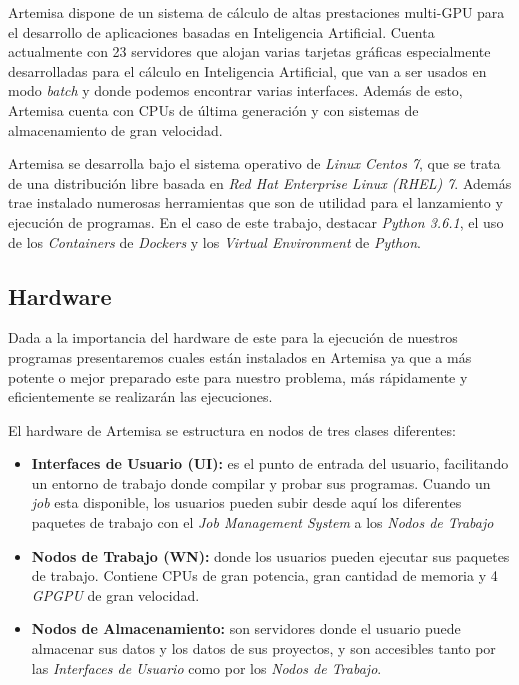 Artemisa dispone de un sistema de cálculo de altas prestaciones multi-GPU para el desarrollo de aplicaciones basadas en Inteligencia Artificial. Cuenta actualmente con 23 servidores que alojan varias tarjetas gráficas especialmente desarrolladas para el cálculo en Inteligencia Artificial, que van a ser usados en modo \textit{batch} y donde podemos encontrar varias interfaces. Además de esto, Artemisa cuenta con CPUs de última generación y con sistemas de almacenamiento de gran velocidad.

Artemisa se desarrolla bajo el sistema operativo de \textit{Linux Centos 7}, que se trata de una distribución libre basada en \textit{Red Hat Enterprise Linux (RHEL) 7}. Además trae instalado numerosas herramientas que son de utilidad para el lanzamiento y ejecución de programas. En el caso de este trabajo, destacar \textit{Python 3.6.1}, el uso de los \textit{Containers} de \textit{Dockers} y los \textit{Virtual Environment} de \textit{Python}.

\subsection{Hardware}
Dada a la importancia del hardware de este para la ejecución de nuestros programas presentaremos cuales están instalados en Artemisa ya que a más potente o mejor preparado este para nuestro problema, más rápidamente y eficientemente se realizarán las ejecuciones.

El hardware de Artemisa se estructura en nodos de tres clases diferentes:
\begin{itemize}
    \item \textbf{Interfaces de Usuario (UI):} es el punto de entrada del usuario, facilitando un entorno de trabajo donde compilar y probar sus programas. Cuando un \textit{job} esta disponible, los usuarios pueden subir desde aquí los diferentes paquetes de trabajo con el \textit{Job Management System} a los \textit{Nodos de Trabajo}
    \item \textbf{Nodos de Trabajo (WN):} donde los usuarios pueden ejecutar sus paquetes de trabajo. Contiene CPUs de gran potencia, gran cantidad de memoria y 4 \textit{GPGPU} de gran velocidad.
    \item \textbf{Nodos de Almacenamiento:} son servidores donde el usuario puede almacenar sus datos y los datos de sus proyectos, y son accesibles tanto por las \textit{Interfaces de Usuario} como por los \textit{Nodos de Trabajo}.
\end{itemize}


